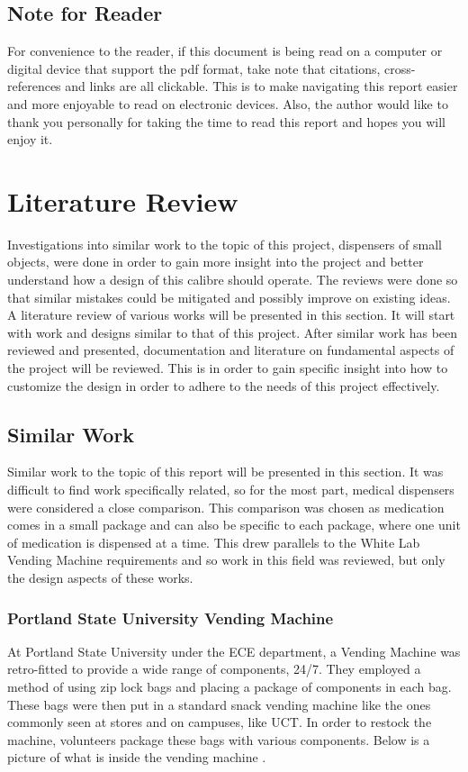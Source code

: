 \documentclass[a4paper,11pt]{article}
\numberwithin{figure}{section}
\numberwithin{table}{section}
\begin{document}
	\subsection{Note for Reader}
	For convenience to the reader, if this document is being read on a computer or digital device that support the pdf format, take note that citations, cross-references and links are all clickable. This is to make navigating this report easier and more enjoyable to read on electronic devices. Also, the author would like to thank you personally for taking the time to read this report and hopes you will enjoy it.
	\newpage
\setlength{\parskip}{1em}
\section{Literature Review}\thispagestyle{sectionstart}
Investigations into similar work to the topic of this project, dispensers of small objects, were done in order to gain more insight into the project and better understand how a design of this calibre should operate. The reviews were done so that similar mistakes could be mitigated and possibly improve on existing ideas. A literature review of various works will be presented in this section. It will start with work and designs similar to that of this project. After similar work has been reviewed and presented, documentation and literature on fundamental aspects of the project will be reviewed. This is in order to gain specific insight into how to customize the design in order to adhere to the needs of this project effectively. 
\subsection{Similar Work}
Similar work to the topic of this report will be presented in this section. It was difficult to find work specifically related, so for the most part, medical dispensers were considered a close comparison. This comparison was chosen as medication comes in a small package and can also be specific to each package, where one unit of medication is dispensed at a time. This drew parallels to the White Lab Vending Machine requirements and so work in this field was reviewed, but only the design aspects of these works.

\subsubsection{Portland State University Vending Machine}
At Portland State University under the ECE department, a Vending Machine was retro-fitted to provide a wide range of components, 24/7. They employed a method of using zip lock bags and placing a package of components in each bag. These bags were then put in a standard snack vending machine like the ones commonly seen at stores and on campuses, like UCT. In order to restock the machine, volunteers package these bags with various components. Below is a picture of what is inside the vending machine \cite{PORTU,vend}.
\end{document}
